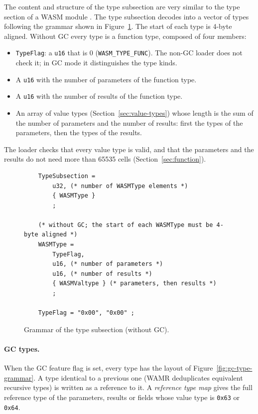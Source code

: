 \documentclass{article}
\begin{document}
The content and structure of the type subsection are very similar to the type section of a WASM module \cite[Sec.~5.5.4]{webassembly2019core}.
The type subsection decodes into a vector of types following the grammar shown in Figure~\ref{fig:type-subsection-grammar}.
The start of each type is 4-byte aligned.
Without GC every type is a function type, composed of four members:
\begin{itemize}
    \item \verb|TypeFlag|: a \verb|u16| that is 0 (\verb|WASM_TYPE_FUNC|).
        The non-GC loader does not check it; in GC mode it distinguishes the type kinds.
    \item A \verb|u16| with the number of parameters of the function type.
    \item A \verb|u16| with the number of results of the function type.
    \item An array of value types (Section~\ref{sec:value-types}) whose length is the sum of the number of parameters and the number of results: first the types of the parameters, then the types of the results.
\end{itemize}
The loader checks that every value type is valid, and that the parameters and the results do not need more than 65535 cells (Section~\ref{sec:function}).

\begin{figure}[H]
\begin{verbatim}
    TypeSubsection =
        u32, (* number of WASMType elements *)
        { WASMType }
        ;

    (* without GC; the start of each WASMType must be 4-byte aligned *)
    WASMType =
        TypeFlag,
        u16, (* number of parameters *)
        u16, (* number of results *)
        { WASMValtype } (* parameters, then results *)
        ;

    TypeFlag = "0x00", "0x00" ;
\end{verbatim}
\caption{Grammar of the type subsection (without GC).}
\label{fig:type-subsection-grammar}
\end{figure}

\paragraph{GC types.}
When the GC feature flag is set, every type has the layout of Figure~\ref{fig:gc-type-grammar}.
A type identical to a previous one (WAMR deduplicates equivalent recursive types) is written as a reference to it.
A \emph{reference type map} gives the full reference type of the parameters, results or fields whose value type is \verb|0x63| or \verb|0x64|.
\end{document}
